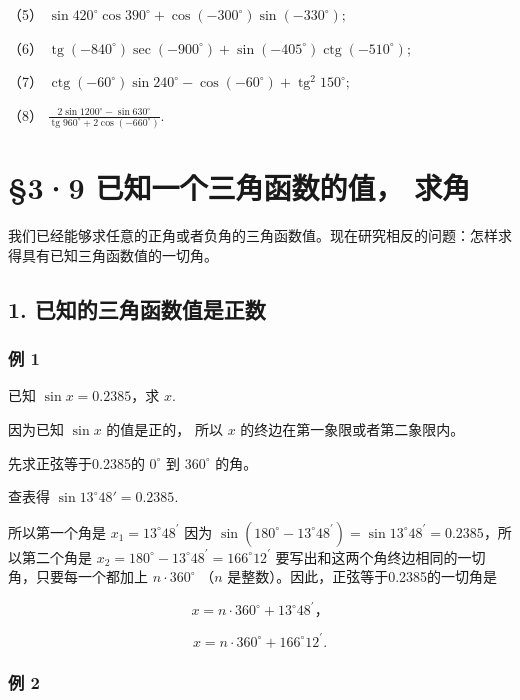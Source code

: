 （5）
\(\sin 420^{\circ}\cos 390^{\circ} + \cos (-300^{\circ})\sin (-330^{\circ});\)

（6）
\(\operatorname{tg}(-840^{\circ})\sec (-900^{\circ}) + \sin (-405^{\circ})\operatorname{ctg}(-510^{\circ});\)

（7）
\(\operatorname{ctg}(-60^{\circ})\sin 240^{\circ} - \cos (-60^{\circ}) + \operatorname{tg}^{2}150^{\circ};\)

（8）
\(\frac{2\sin 1200^{\circ} - \sin 630^{\circ}}{\operatorname{tg}960^{\circ} + 2\cos(-660^{\circ})}\).

\section{§3·9 已知一个三角函数的值， 求角}

我们已经能够求任意的正角或者负角的三角函数值。现在研究相反的问题：怎样求得具有已知三角函数值的一切角。

\subsection{1. 已知的三角函数值是正数}

\subsubsection{例 1}

已知 \(\sin x = 0.2385\)，求 \(x\).

 因为已知 \(\sin x\) 的值是正的， 所以 \(x\)
的终边在第一象限或者第二象限内。

先求正弦等于0.2385的 \(0^{\circ}\) 到 \(360^{\circ}\) 的角。

查表得 \(\sin 13^{\circ}48' = 0.2385\).

所以第一个角是 \(x_{1} = 13^{\circ}48^{\prime}\) 因为
\(\sin (180^{\circ} - 13^{\circ}48^{\prime}) = \sin 13^{\circ}48^{\prime} = 0.2385\)，所以第二个角是
\(x_{2} = 180^{\circ} - 13^{\circ}48^{\prime} = 166^{\circ}12^{\prime}\)
要写出和这两个角终边相同的一切角，只要每一个都加上
\(n \cdot 360^{\circ}\) （\(n\) 是整数）。因此，正弦等于0.2385的一切角是

\[
x = n \cdot 360 ^{\circ} + 13 ^{\circ} 48 ^{\prime}\text{，}
\]

\[
x = n \cdot 360 ^{\circ} + 166 ^{\circ} 12 ^{\prime}.
\]

\subsubsection{例 2}


